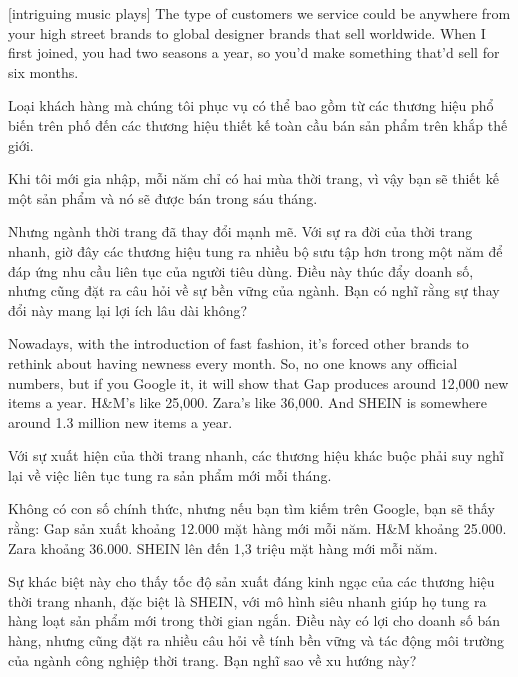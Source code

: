 \documentclass[a4paper]{article}
\begin{document}
	[intriguing music plays]
	The type of customers we service could be anywhere from your high street brands to global designer brands that sell worldwide.
	When I first joined, you had two seasons a year, so you'd make something that'd sell for six months.
	
	\begin{vietnamese-v2}
		
		Loại khách hàng mà chúng tôi phục vụ có thể bao gồm từ các thương hiệu phổ biến trên phố đến các thương hiệu thiết kế toàn cầu bán sản phẩm trên khắp thế giới.  
		
		Khi tôi mới gia nhập, mỗi năm chỉ có hai mùa thời trang, vì vậy bạn sẽ thiết kế một sản phẩm và nó sẽ được bán trong sáu tháng.  
		
		Nhưng ngành thời trang đã thay đổi mạnh mẽ. Với sự ra đời của thời trang nhanh, giờ đây các thương hiệu tung ra nhiều bộ sưu tập hơn trong một năm để đáp ứng nhu cầu liên tục của người tiêu dùng. Điều này thúc đẩy doanh số, nhưng cũng đặt ra câu hỏi về sự bền vững của ngành. Bạn có nghĩ rằng sự thay đổi này mang lại lợi ích lâu dài không?
	\end{vietnamese-v2}
	
	Nowadays, with the introduction of fast fashion, it's forced other brands to rethink about having newness every month.
	So, no one knows any official numbers, but if you Google it, it will show that Gap produces around 12,000 new items a year.
	H\&M's like 25,000.
	Zara's like 36,000.
	And SHEIN is somewhere around 1.3 million new items a year.
	
	\begin{vietnamese-v2}
		Với sự xuất hiện của thời trang nhanh, các thương hiệu khác buộc phải suy nghĩ lại về việc liên tục tung ra sản phẩm mới mỗi tháng.  
		
		Không có con số chính thức, nhưng nếu bạn tìm kiếm trên Google, bạn sẽ thấy rằng:  
		Gap sản xuất khoảng 12.000 mặt hàng mới mỗi năm.  
		H\&M khoảng 25.000.  
		Zara khoảng 36.000.  
		SHEIN lên đến 1,3 triệu mặt hàng mới mỗi năm.  
		
		Sự khác biệt này cho thấy tốc độ sản xuất đáng kinh ngạc của các thương hiệu thời trang nhanh, đặc biệt là SHEIN, với mô hình siêu nhanh giúp họ tung ra hàng loạt sản phẩm mới trong thời gian ngắn. Điều này có lợi cho doanh số bán hàng, nhưng cũng đặt ra nhiều câu hỏi về tính bền vững và tác động môi trường của ngành công nghiệp thời trang. Bạn nghĩ sao về xu hướng này?
	\end{vietnamese-v2}
	
\end{document}
